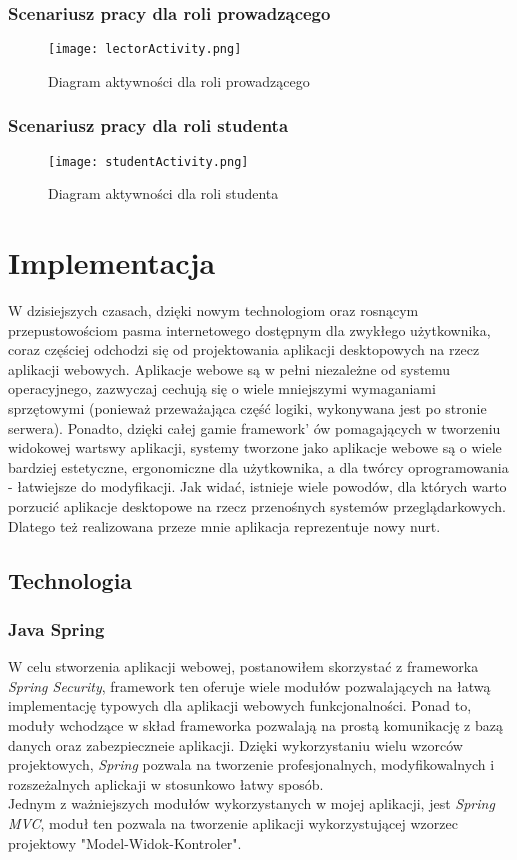 \documentclass[a4paper, titlepage]{article}
\begin{document}
\subsubsection{Scenariusz pracy dla roli prowadzącego}

\begin{figure}[H]
      \centering
      \texttt{[image: lectorActivity.png]}
      \caption{Diagram aktywności dla roli prowadzącego}
  \end{figure}

\subsubsection{Scenariusz pracy dla roli studenta}

\begin{figure}[H]
      \centering
      \texttt{[image: studentActivity.png]}
      \caption{Diagram aktywności dla roli studenta}
  \end{figure}

\section{Implementacja}
W dzisiejszych czasach, dzięki nowym technologiom oraz rosnącym przepustowościom pasma internetowego dostępnym dla zwykłego użytkownika, coraz częściej odchodzi się od projektowania aplikacji desktopowych na rzecz aplikacji webowych. Aplikacje webowe są w pełni niezależne od systemu operacyjnego, zazwyczaj cechują się o wiele mniejszymi wymaganiami sprzętowymi (ponieważ przeważająca część logiki, wykonywana jest po stronie serwera). Ponadto, dzięki całej gamie framework' ów pomagających w tworzeniu widokowej wartswy aplikacji, systemy tworzone jako aplikacje webowe są o wiele bardziej estetyczne, ergonomiczne dla użytkownika, a dla twórcy oprogramowania - łatwiejsze do modyfikacji. 
	Jak widać, istnieje wiele powodów, dla których warto porzucić aplikacje desktopowe na rzecz przenośnych systemów przeglądarkowych. Dlatego też realizowana przeze mnie aplikacja reprezentuje nowy nurt.

\subsection{Technologia}
	\subsubsection{Java Spring}
	W celu stworzenia aplikacji webowej, postanowiłem skorzystać z frameworka \textit{Spring Security}, framework ten oferuje wiele modułów pozwalających na łatwą implementację typowych dla aplikacji webowych funkcjonalności. Ponad to, moduły wchodzące w skład frameworka pozwalają na prostą komunikację z bazą danych oraz zabezpieczneie aplikacji. Dzięki wykorzystaniu wielu wzorców projektowych, \textit{Spring} pozwala na tworzenie profesjonalnych, modyfikowalnych i rozszeżalnych aplickaji w stosunkowo łatwy sposób.
	\\Jednym z ważniejszych modułów wykorzystanych w mojej aplikacji, jest \textit{Spring MVC}, moduł ten pozwala na tworzenie aplikacji wykorzystującej wzorzec projektowy "Model-Widok-Kontroler".
\end{document}
